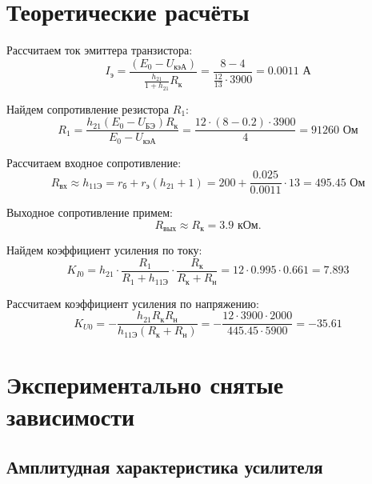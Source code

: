 \section{Теоретические расчёты}

Рассчитаем ток эмиттера транзистора: 
\begin{equation}
I_\text{э} = \frac{(E_0 - U_\text{кэА})}{\frac{h_{21}}{1+h_{21}}R_\text{к}} = \frac{8 - 4}{\frac{12}{13} \cdot 3900} = 0.0011 \text{ А}
\end{equation}

Найдем сопротивление резистора $R_1$:
\begin{equation}
R_1 = \frac{h_{21}(E_0-U_\text{БЭ})R_\text{к}}{E_0-U_\text{кэА}} = \frac{12 \cdot (8 - 0.2) \cdot 3900}{4} = 91260 \text{ Ом}
\end{equation}

Рассчитаем входное сопротивление:
\begin{equation}
R_\text{вх} \approx h_\text{11Э} = r_\text{б} + r_\text{э}(h_{21} + 1) = 200 + \frac{0.025}{0.0011} \cdot 13 = 495.45 \text{ Ом}
\end{equation}

Выходное сопротивление примем:
\begin{equation}
R_\text{вых} \approx R_\text{к} = 3.9 \text{ кОм}.
\end{equation}

Найдем коэффициент усиления по току:
\begin{equation}
K_{I0} = h_{21} \cdot \frac{R_1}{R_1 + h_\text{11Э}} \cdot \frac{R_\text{к}}{R_\text{к}+R_\text{н}} 
= 12 \cdot 0.995 \cdot 0.661 = 7.893
\end{equation}

Рассчитаем коэффициент усиления по напряжению:
\begin{equation}
K_{U0} = -\frac{h_{21} R_\text{к} R_\text{н}}{h_\text{11Э}(R_\text{к} + R_\text{н})} = -\frac{12 \cdot 3900 \cdot 2000}{445.45 \cdot 5900} = -35.61
\end{equation}

\newpage

\section{Экспериментально снятые зависимости}

\subsection{Амплитудная характеристика усилителя}

